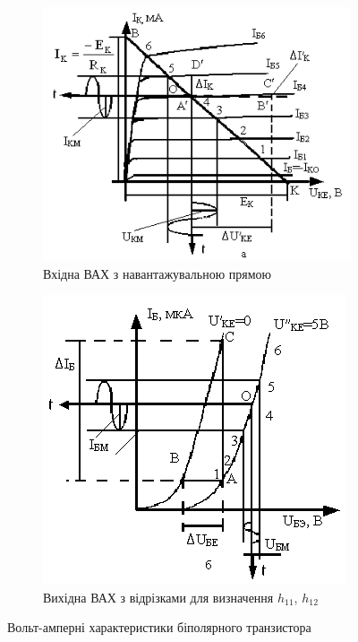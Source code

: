 \documentclass[a4paper,oneside,12pt,DIV=12,titlepage]{scrartcl}
\begin{document}
			\begin{figure}[h]
				\centering
				\begin{subfigure}[b]{0.45\textwidth}
					\includegraphics[width=\textwidth]{VAC-01.png}
					\caption{Вхідна ВАХ з навантажувальною прямою}
				\end{subfigure}
				\begin{subfigure}[b]{0.45\textwidth}
					\includegraphics[width=\textwidth]{VAC-02.png}
					\caption{Вихідна ВАХ з відрізками для визначення $h_{11}$, $h_{12}$}
				\end{subfigure}
				\caption{Вольт-амперні характеристики біполярного транзистора}
				\label{fig:VACs}
			\end{figure}
			
\end{document}
